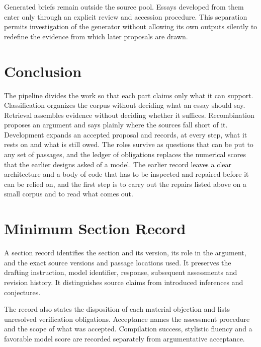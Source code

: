 \documentclass[11pt]{article}
\begin{document}
Generated briefs remain outside the source pool. Essays developed from them enter only through an explicit review and accession procedure. This separation permits investigation of the generator without allowing its own outputs silently to redefine the evidence from which later proposals are drawn.

\section{Conclusion}

The pipeline divides the work so that each part claims only what it can support. Classification organizes the corpus without deciding what an essay should say. Retrieval assembles evidence without deciding whether it suffices. Recombination proposes an argument and says plainly where the sources fall short of it. Development expands an accepted proposal and records, at every step, what it rests on and what is still owed. The roles survive as questions that can be put to any set of passages, and the ledger of obligations replaces the numerical scores that the earlier designs asked of a model. The earlier record leaves a clear architecture and a body of code that has to be inspected and repaired before it can be relied on, and the first step is to carry out the repairs listed above on a small corpus and to read what comes out.

\appendix
\section{Minimum Section Record}

A section record identifies the section and its version, its role in the argument, and the exact source versions and passage locations used. It preserves the drafting instruction, model identifier, response, subsequent assessments and revision history. It distinguishes source claims from introduced inferences and conjectures.

The record also states the disposition of each material objection and lists unresolved verification obligations. Acceptance names the assessment procedure and the scope of what was accepted. Compilation success, stylistic fluency and a favorable model score are recorded separately from argumentative acceptance.
\end{document}
